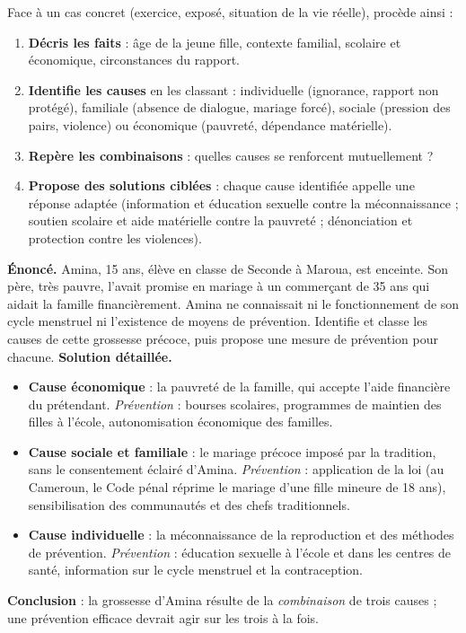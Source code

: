 \documentclass[11pt]{article}
\newcounter{popsec}
\newcounter{popsub}
\newcommand{\courssub}[1]{%
  \stepcounter{popsub}%
  \par\vspace{9pt}\noindent{\popxbold\fontsize{11.5}{13}\selectfont\color{popink}{\color{poporange}\thepopsec.\thepopsub}\hspace{6pt}#1}\par\nopagebreak\vspace{4pt}
}
\begin{document}
\courssub{Méthode : analyser une situation concrète}

\begin{methode}
Face à un cas concret (exercice, exposé, situation de la vie réelle), procède ainsi :
\begin{enumerate}
\item \textbf{Décris les faits} : âge de la jeune fille, contexte familial, scolaire et économique, circonstances du rapport.
\item \textbf{Identifie les causes} en les classant : individuelle (ignorance, rapport non protégé), familiale (absence de dialogue, mariage forcé), sociale (pression des pairs, violence) ou économique (pauvreté, dépendance matérielle).
\item \textbf{Repère les combinaisons} : quelles causes se renforcent mutuellement ?
\item \textbf{Propose des solutions ciblées} : chaque cause identifiée appelle une réponse adaptée (information et éducation sexuelle contre la méconnaissance ; soutien scolaire et aide matérielle contre la pauvreté ; dénonciation et protection contre les violences).
\end{enumerate}
\end{methode}

\begin{exoresolu}
\textbf{Énoncé.} Amina, 15 ans, élève en classe de Seconde à Maroua, est enceinte. Son père, très pauvre, l'avait promise en mariage à un commerçant de 35 ans qui aidait la famille financièrement. Amina ne connaissait ni le fonctionnement de son cycle menstruel ni l'existence de moyens de prévention. Identifie et classe les causes de cette grossesse précoce, puis propose une mesure de prévention pour chacune.
\tcblower
\textbf{Solution détaillée.}
\begin{itemize}
\item \textbf{Cause économique} : la pauvreté de la famille, qui accepte l'aide financière du prétendant. \emph{Prévention} : bourses scolaires, programmes de maintien des filles à l'école, autonomisation économique des familles.
\item \textbf{Cause sociale et familiale} : le mariage précoce imposé par la tradition, sans le consentement éclairé d'Amina. \emph{Prévention} : application de la loi (au Cameroun, le Code pénal réprime le mariage d'une fille mineure de 18 ans), sensibilisation des communautés et des chefs traditionnels.
\item \textbf{Cause individuelle} : la méconnaissance de la reproduction et des méthodes de prévention. \emph{Prévention} : éducation sexuelle à l'école et dans les centres de santé, information sur le cycle menstruel et la contraception.
\end{itemize}
\textbf{Conclusion} : la grossesse d'Amina résulte de la \emph{combinaison} de trois causes ; une prévention efficace devrait agir sur les trois à la fois.
\end{exoresolu}
\end{document}
